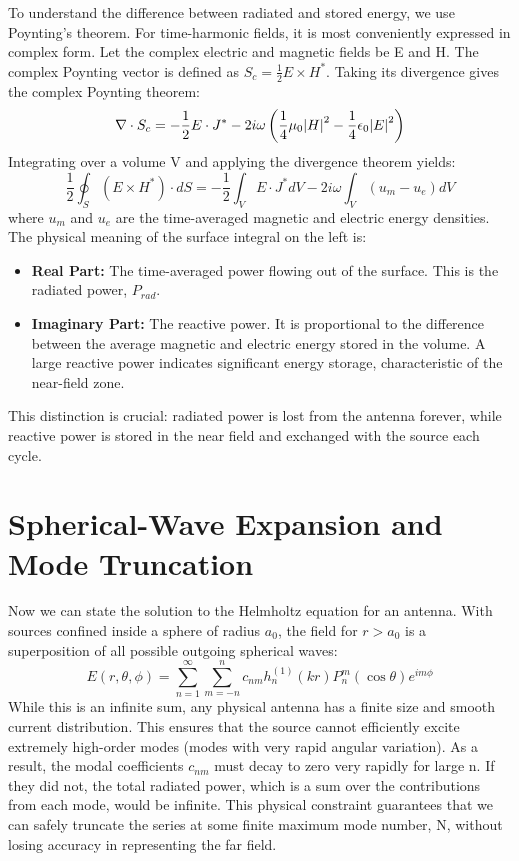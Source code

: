 \documentclass[11pt,a4paper]{article}
\begin{document}
To understand the difference between radiated and stored energy, we use Poynting's theorem. For time-harmonic fields, it is most conveniently expressed in complex form.
Let the complex electric and magnetic fields be E and H. The complex Poynting vector is defined as \(S_{c}=\frac{1}{2}E\times H^{*}\). Taking its divergence gives the complex Poynting theorem:
\begin{equation}
    \nabla\cdot S_{c}=-\frac{1}{2}E\cdot J^{*}-2i\omega\left(\frac{1}{4}\mu_{0}\abs{H}^{2}-\frac{1}{4}\epsilon_{0}\abs{E}^{2}\right)
\end{equation}
Integrating over a volume V and applying the divergence theorem yields:
\begin{equation}
    \frac{1}{2}\oint_{S}(E\times H^{*})\cdot dS=-\frac{1}{2}\int_{V}E\cdot J^{*}dV-2i\omega\int_{V}(u_{m}-u_{e})dV
\end{equation}
where \(u_{m}\) and \(u_{e}\) are the time-averaged magnetic and electric energy densities. The physical meaning of the surface integral on the left is:
\begin{itemize}
    \item \textbf{Real Part:} The time-averaged power flowing out of the surface. This is the radiated power, \(P_{rad}\).
    \item \textbf{Imaginary Part:} The reactive power. It is proportional to the difference between the average magnetic and electric energy stored in the volume. A large reactive power indicates significant energy storage, characteristic of the near-field zone.
\end{itemize}
This distinction is crucial: radiated power is lost from the antenna forever, while reactive power is stored in the near field and exchanged with the source each cycle.

\section{Spherical-Wave Expansion and Mode Truncation}

Now we can state the solution to the Helmholtz equation for an antenna. With sources confined inside a sphere of radius \(a_{0}\), the field for \(r>a_{0}\) is a superposition of all possible outgoing spherical waves:
\begin{equation}
    E(r,\theta,\phi)=\sum_{n=1}^{\infty}\sum_{m=-n}^{n}c_{nm}h_{n}^{(1)}(kr)P_{n}^{m}(\cos\theta)e^{im\phi}
\end{equation}
While this is an infinite sum, any physical antenna has a finite size and smooth current distribution. This ensures that the source cannot efficiently excite extremely high-order modes (modes with very rapid angular variation). As a result, the modal coefficients \(c_{nm}\) must decay to zero very rapidly for large n. If they did not, the total radiated power, which is a sum over the contributions from each mode, would be infinite. This physical constraint guarantees that we can safely truncate the series at some finite maximum mode number, N, without losing accuracy in representing the far field.
\end{document}
